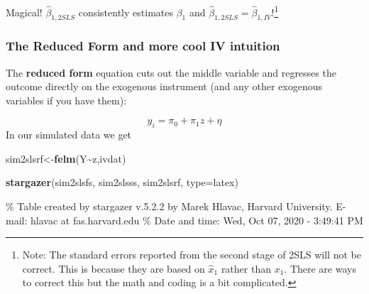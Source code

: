 \documentclass[
]{article}
\newenvironment{Shaded}{\begin{snugshade}}{\end{snugshade}}
\newcommand{\DataTypeTok}[1]{\textcolor[rgb]{0.13,0.29,0.53}{#1}}
\newcommand{\KeywordTok}[1]{\textcolor[rgb]{0.13,0.29,0.53}{\textbf{#1}}}
\newcommand{\NormalTok}[1]{#1}
\newcommand{\OperatorTok}[1]{\textcolor[rgb]{0.81,0.36,0.00}{\textbf{#1}}}
\newcommand{\StringTok}[1]{\textcolor[rgb]{0.31,0.60,0.02}{#1}}
\begin{document}
Magical! \(\hat{\beta}_{1,2SLS}\) consistently estimates \(\beta_1\) and
\(\hat{\beta}_{1,2SLS}=\hat{\beta}_{1,IV}\)!\footnote{Note: The standard
  errors reported from the second stage of 2SLS will not be correct.
  This is because they are based on \(\hat{x}_1\) rather than \(x_1\).
  There are ways to correct this but the math and coding is a bit
  complicated.}

\subsubsection{The Reduced Form and more cool IV intuition}

The \textbf{reduced form} equation cuts out the middle variable and
regresses the outcome directly on the exogenous instrument (and any
other exogenous variables if you have them):

\[
y_i=\pi_0+\pi_1z+\eta
\] In our simulated data we get

\begin{Shaded}
\begin{Highlighting}[]
\NormalTok{sim2slsrf\textless{}{-}}\KeywordTok{felm}\NormalTok{(Y}\OperatorTok{\textasciitilde{}}\NormalTok{z,ivdat)}

\KeywordTok{stargazer}\NormalTok{(sim2slsfs, sim2slsss, sim2slsrf,  }\DataTypeTok{type=}\StringTok{\textquotesingle{}latex\textquotesingle{}}\NormalTok{)}
\end{Highlighting}
\end{Shaded}

\% Table created by stargazer v.5.2.2 by Marek Hlavac, Harvard
University. E-mail: hlavac at fas.harvard.edu \% Date and time: Wed, Oct
07, 2020 - 3:49:41 PM
\end{document}

